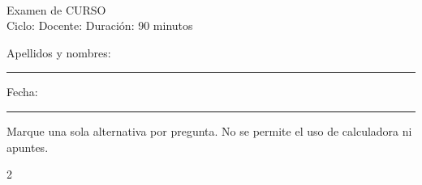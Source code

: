 \documentclass[11pt, a4paper]{article}
\newcommand{\NombreCurso}{{{CURSO}}}
\begin{document}
\begin{center}
  {\Large\sffamily\bfseries\color{AzulPizarra} \NombreAcademia}\\[2pt]
  {\large\sffamily Examen de \NombreCurso}\\[2pt]
  {\small\sffamily\color{GrisMedio} Ciclo: \CicloActual \quad
    Docente: \NombreDocente \quad Duración: 90 minutos}
\end{center}

\vspace{4pt}
\noindent\sffamily\small
Apellidos y nombres: \rule{9cm}{0.3pt} \quad Fecha: \rule{3cm}{0.3pt}
\normalfont\normalsize

\vspace{8pt}
\begin{cajaadvert}
  Marque una sola alternativa por pregunta. No se permite el uso de
  calculadora ni apuntes.
\end{cajaadvert}

\begin{multicols}{2}

\ejercicio %
\begin{alternativas}
  \item $ $
  \item $ $
  \item $ $
  \item $ $
  \item $ $
\end{alternativas}
\vspace{0.3cm}

\end{multicols}
\end{document}
